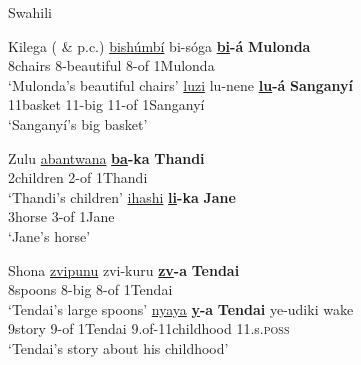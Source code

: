 \documentclass[output=paper
,modfonts
,nonflat]{langsci/langscibook}
\begin{document}
\begin{exe}
		\ex Swahili \citep[100]{Carstens1991} \label{ex-carstens:8}
{\multicolsep=0pt\begin{multicols}{2}
		\xlist
		\endxlist
\end{multicols}}
\end{exe}\pagebreak
\begin{exe}
	\ex Kilega (\citealt{Kinyalolo1991} \& p.c.)\label{ex-carstens:9}
	\xlist
	\ex 
	\gll \uline{bishúmbí}   bi-sóga        \textbf{\uline{bi}-á}   \textbf{Mulonda} \\
	8chairs       8-beautiful     8-of    1Mulonda\\
	\glt `Mulonda’s beautiful chairs'  	
	\ex 
	\gll \uline{luzi}               lu-nene   \textbf{\uline{lu}-á}    \textbf{Sanganyí}\\
	11basket   11-big    11-of      1Sanganyí\\
	\glt `Sanganyí’s big basket'
	\endxlist
\end{exe}
\begin{exe}
	\ex Zulu \label{ex-carstens:10}
	\xlist
	\ex 
	\gll \uline{abantwana} \textbf{\uline{ba}{}-ka}   \textbf{Thandi} \\
	2children     2-of        1Thandi\\
	\glt `Thandi’s children'  	
	\ex 
	\gll \uline{ihashi}   \textbf{\uline{li}{}-ka}  \textbf{Jane}\\
	3horse 3-of     1Jane\\
	\glt `Jane’s horse'
	\endxlist
\end{exe}
\begin{exe}
	\ex Shona \label{ex-carstens:11}
	\xlist
	\ex 
	\gll \uline{zvipunu}   zvi-kuru \textbf{\uline{zv}{}-a}     \textbf{Tendai} \\
	8spoons   8-big       8-of    1Tendai\\
	\glt `Tendai’s large spoons'  	
	\ex 
	\gll \uline{nyaya}   \textbf{\uline{y}{}-a}     \textbf{Tendai}   ye-udiki             wake\\
	9story   9-of    1Tendai   9.of-11childhood     11.s.\textsc{poss}\\
	\glt `Tendai's story about his childhood'
	\endxlist
\end{exe}
\end{document}
